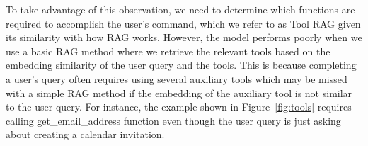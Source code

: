 \begin{table}[!t]
\vspace{-3mm}
\caption{
Latency, size, and success rate of TinyAgent models before and after quantization. Latency is the end-to-end latency of the function calling planner, including the prompt processing time and generation.}
\vspace{-1mm}
\begin{center}
\small{
}
\end{center}
\label{table:t2}
\vspace{2mm}
\end{table}

To take advantage of this observation, we need to determine which functions are required to accomplish the user’s command, which we refer to as Tool RAG given its similarity with how RAG works. However, the model performs poorly when we use a basic RAG method where we retrieve the relevant tools based on the embedding similarity of the user query and the tools. 
This is because completing a user’s query often requires using several auxiliary tools which may be missed with a simple RAG method if the embedding of the auxiliary tool is not similar to the user query. For instance, the example shown in Figure~\ref{fig:tools} requires calling get\_email\_address function even though the user query is just asking about creating a calendar invitation.

